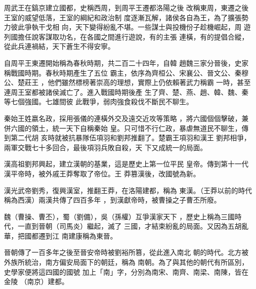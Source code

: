 \documentclass[avery5371,grid]{flashcards}
\begin{document}
{周武王在鎬京建立國都，史稱西周，到周平王遷都洛陽之後
改稱東周，東遷之後王室的威望低落，王室的綱紀和政治制
度逐漸瓦解，諸侯各自為王，為了擴張勢力彼此爭執干戈相
向，天下變得紛亂不堪。一些謀士與投機份子趁機崛起，周
遊列國擔任說客謀取功名，在各國之間進行遊說，有的主張
連橫，有的提倡合縱，從此兵連禍結，天下蒼生不得安寧。} %
{} %

{自周平王東遷開始稱為春秋時期，共二百二十四年，自韓
趙魏三家分晉後，史家稱戰國時期。春秋時期產生了五位
霸主，依序為齊桓公、宋襄公、晉文公、秦穆公、楚莊王
，他們雖然標榜著崇高的理想，實際上仍依賴著武力稱霸
一時，甚至連周王室都被諸侯滅亡了。進入戰國時期後產
生了齊、楚、燕、趙、韓、魏、秦等七個強國。七雄間彼
此戰爭，弱肉強食殺伐不斷民不聊生。} %
{} %

{秦始王姓嬴名政，採用張儀的連橫外交及遠交近攻等策略
，將六國個個擊破，兼併六國的領土，統一天下自稱秦始
皇。只可惜不行仁政，暴虐無道民不聊生，傳到第二代胡
亥時就被抗暴隊伍項羽和劉邦推翻了。楚霸王項羽和漢王
劉邦相爭，兩軍交戰七十多回合，最後項羽兵敗自殺，天
下又成統一的局面。} %
{} %








{漢高祖劉邦興起，建立漢朝的基業，這是歷史上第一位平民
皇帝。傳到第十一代漢平帝時，被外戚王莽奪取了帝位。王
莽篡漢後，改國號為新。} %
{} %

{漢光武帝劉秀，復興漢室，推翻王莽，在洛陽建都，稱為
東漢。（王莽以前的時代稱為西漢）兩漢共傳了四百多年
，到漢獻帝時，被曹操之子曹丕所廢。} %
{} %

{魏（曹操、曹丕），蜀（劉備），吳（孫權）互爭漢家天下
，歷史上稱為三國時代，一直到晉朝（司馬炎）繼起，滅了
三國，才結束紛亂的局面。又因為五胡亂華，把國都遷到江
南建康稱為東晉。} %
{} %

{晉朝傳了一百多年之後至晉安帝時被劉裕所篡，從此進入南北
朝的時代。北方被外族所統治，南方偏安局面下的朝廷，稱為
南朝。為了與其他的朝代有所區別，史學家便將這四國的國號
加上「南」字，分別為南宋、南齊、南梁、南陳，皆在金陵
（南京）建都。} %
{} %
\end{document}
